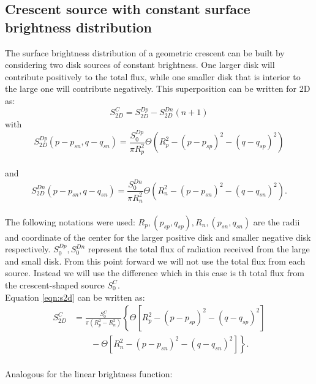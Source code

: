 \subsection{Crescent source with constant surface brightness distribution}

The surface brightness distribution of a geometric crescent can be built by considering two disk sources of constant brightness. One larger disk will contribute positively to the total flux, while one smaller disk 
that is interior to the large one will contribute negatively. This superposition can be written for 2D as:\\

\begin{equation}
 S_{2D}^C =  S_{2D}^{Dp} -  S_{2D}^{Dn}   (n+1)
 \label{eqn:s2d}
\end{equation}
with\\

\begin{equation}
 S_{2D}^{Dp}(p-p_{sn}, q-q_{sn}) = \frac{S_0^{Dp}}{\pi R_p^2} \Theta \left( R_p^2 - \left( p-p_{sp} \right)^2 - \left( q-q_{sp} \right)^2 \right)
\end{equation}
\\
and
\begin{equation}
 S_{2D}^{Dn}(p-p_{sn}, q-q_{sn}) = \frac{S_0^{Dn}}{\pi R_n^2} \Theta \left( R_n^2 - \left( p-p_{sn} \right)^2 - \left( q-q_{sn} \right)^2 \right).
\end{equation}
\\
The following notations were used: $R_p, (p_{sp}, q_{sp}), R_n, (p_{sn},q_{sn})$ are the radii and coordinate of the center for the larger positive disk and smaller negative disk respectively.  $S_0^{Dp},S_0^{Dn}$ represent the total flux of radiation received from the large and small disk. From this point forward we will not use the total flux from each source. Instead we will 
use the difference which in this case is th total flux from the crescent-shaped source $S_0^C$. \\
Equation \ref{eqn:s2d} can be written as:\\

\begin{align}
 S_{2D}^C &= \frac{S_0^C}{\pi \left(R_p^2-R_n^2 \right)} \left\{ \Theta \left[ R_p^2 - \left( p-p_{sp} \right)^2 - \left( q-q_{sp} \right)^2 \right] \right.\nonumber\\
 &\qquad \left. {} -  \Theta \left[ R_n^2 - \left( p-p_{sn} \right)^2 - \left( q-q_{sn} \right)^2 \right] \right\}.
\end{align}
\\
Analogous for the linear brightness function:


